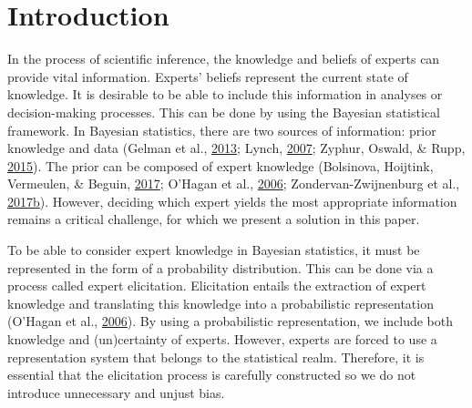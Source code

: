 \documentclass[openright,titlepage,12pt,a4paper]{book}
\begin{document}
\hypertarget{ch03introduction}{%
\section{Introduction}\label{ch03introduction}}

In the process of scientific inference, the knowledge and beliefs of experts can provide vital information. Experts' beliefs represent the current state of knowledge. It is desirable to be able to include this information in analyses or decision-making processes. This can be done by using the Bayesian statistical framework. In Bayesian statistics, there are two sources of information: prior knowledge and data (Gelman et al., \protect\hyperlink{ref-gelman_bayesian_2013}{2013}; Lynch, \protect\hyperlink{ref-lynch_introduction_2007}{2007}; Zyphur, Oswald, \& Rupp, \protect\hyperlink{ref-zyphur_bayesian_2015}{2015}). The prior can be composed of expert knowledge (Bolsinova, Hoijtink, Vermeulen, \& Beguin, \protect\hyperlink{ref-bolsinova_using_2017}{2017}; O'Hagan et al., \protect\hyperlink{ref-ohagan_uncertain_2006}{2006}; Zondervan-Zwijnenburg et al., \protect\hyperlink{ref-zondervan-zwijnenburg_application_2017}{2017}\protect\hyperlink{ref-zondervan-zwijnenburg_application_2017}{b}). However, deciding which expert yields the most appropriate information remains a critical challenge, for which we present a solution in this paper.

To be able to consider expert knowledge in Bayesian statistics, it must be represented in the form of a probability distribution. This can be done via a process called expert elicitation. Elicitation entails the extraction of expert knowledge and translating this knowledge into a probabilistic representation (O'Hagan et al., \protect\hyperlink{ref-ohagan_uncertain_2006}{2006}). By using a probabilistic representation, we include both knowledge and (un)certainty of experts. However, experts are forced to use a representation system that belongs to the statistical realm. Therefore, it is essential that the elicitation process is carefully constructed so we do not introduce unnecessary and unjust bias.
\end{document}
